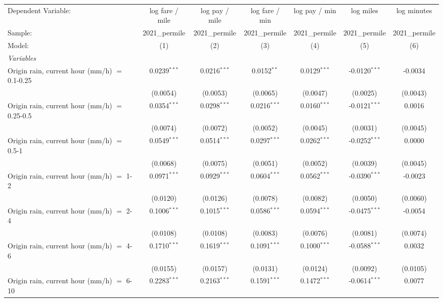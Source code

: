 \ifdefined\ifclassloaded
{}
\fi
\begingroup
\centering
\begin{tabular}{lcccccc}
   \tabularnewline \midrule \midrule
   Dependent Variable: & log fare / mile & log pay / mile & log fare / min & log pay / min & log miles & log minutes\\
   Sample: & 2021\_permile & 2021\_permile & 2021\_permile & 2021\_permile & 2021\_permile & 2021\_permile \\
   Model: & (1) & (2) & (3) & (4) & (5) & (6)\\
   \midrule
   \emph{Variables}\\
   Origin rain, current hour (mm/h) $=$ 0.1-0.25 & 0.0239$^{***}$ & 0.0216$^{***}$ & 0.0152$^{**}$ & 0.0129$^{***}$ & -0.0120$^{***}$ & -0.0034\\
    & (0.0054) & (0.0053) & (0.0065) & (0.0047) & (0.0025) & (0.0043)\\
   Origin rain, current hour (mm/h) $=$ 0.25-0.5 & 0.0354$^{***}$ & 0.0298$^{***}$ & 0.0216$^{***}$ & 0.0160$^{***}$ & -0.0121$^{***}$ & 0.0016\\
    & (0.0074) & (0.0072) & (0.0052) & (0.0045) & (0.0031) & (0.0045)\\
   Origin rain, current hour (mm/h) $=$ 0.5-1 & 0.0549$^{***}$ & 0.0514$^{***}$ & 0.0297$^{***}$ & 0.0262$^{***}$ & -0.0252$^{***}$ & 0.0000\\
    & (0.0068) & (0.0075) & (0.0051) & (0.0052) & (0.0039) & (0.0045)\\
   Origin rain, current hour (mm/h) $=$ 1-2 & 0.0971$^{***}$ & 0.0929$^{***}$ & 0.0604$^{***}$ & 0.0562$^{***}$ & -0.0390$^{***}$ & -0.0023\\
    & (0.0120) & (0.0126) & (0.0078) & (0.0082) & (0.0050) & (0.0060)\\
   Origin rain, current hour (mm/h) $=$ 2-4 & 0.1006$^{***}$ & 0.1015$^{***}$ & 0.0586$^{***}$ & 0.0594$^{***}$ & -0.0475$^{***}$ & -0.0054\\
    & (0.0108) & (0.0108) & (0.0083) & (0.0076) & (0.0081) & (0.0074)\\
   Origin rain, current hour (mm/h) $=$ 4-6 & 0.1710$^{***}$ & 0.1619$^{***}$ & 0.1091$^{***}$ & 0.1000$^{***}$ & -0.0588$^{***}$ & 0.0032\\
    & (0.0155) & (0.0157) & (0.0131) & (0.0124) & (0.0092) & (0.0105)\\
   Origin rain, current hour (mm/h) $=$ 6-10 & 0.2283$^{***}$ & 0.2163$^{***}$ & 0.1591$^{***}$ & 0.1472$^{***}$ & -0.0614$^{***}$ & 0.0077\\

\end{tabular}
